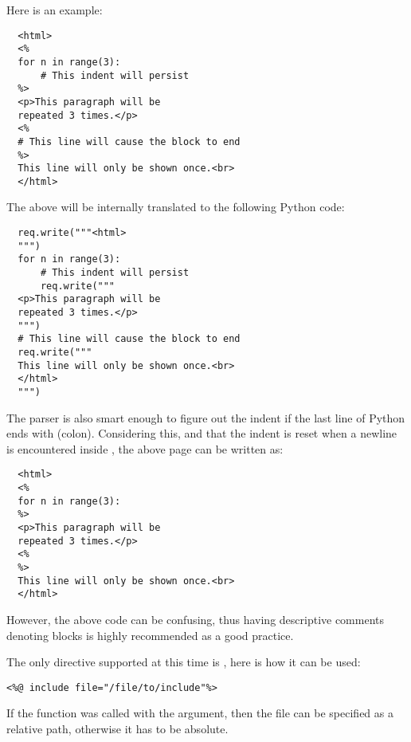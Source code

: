 Here is an example:
\begin{verbatim}
  <html>
  <%
  for n in range(3):
      # This indent will persist
  %>
  <p>This paragraph will be 
  repeated 3 times.</p>
  <%
  # This line will cause the block to end
  %>
  This line will only be shown once.<br>
  </html>
\end{verbatim}

The above will be internally translated to the following Python code:

\begin{verbatim}
  req.write("""<html>
  """)
  for n in range(3):
      # This indent will persist
      req.write("""
  <p>This paragraph will be
  repeated 3 times.</p>
  """)
  # This line will cause the block to end
  req.write("""
  This line will only be shown once.<br>
  </html>
  """)
\end{verbatim}

The parser is also smart enough to figure out the indent if the last
line of Python ends with \samp{:} (colon). Considering this, and that the
indent is reset when a newline is encountered inside \samp{<\% \%>}, the
above page can be written as:

\begin{verbatim}
  <html>
  <%
  for n in range(3):
  %>
  <p>This paragraph will be 
  repeated 3 times.</p>
  <%
  %>
  This line will only be shown once.<br>
  </html>
\end{verbatim}

However, the above code can be confusing, thus having descriptive
comments denoting blocks is highly recommended as a good practice.

The only directive supported at this time is , here is
how it can be used:

\begin{verbatim}
<%@ include file="/file/to/include"%>
\end{verbatim}

If the  function was called with the 
argument, then the file can be specified as a relative path, otherwise
it has to be absolute.

